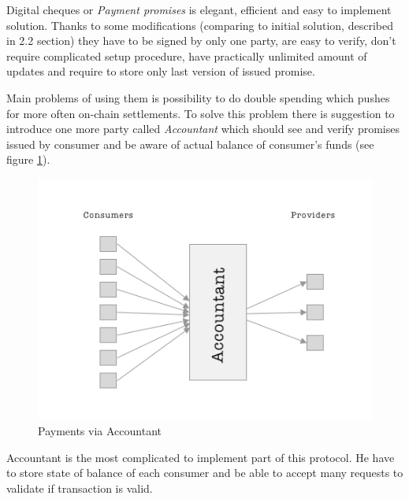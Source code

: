 \documentclass[a4paper,12pt]{article}
\begin{document}
Digital cheques or \textit{Payment promises} is elegant, efficient and easy to 
implement solution. Thanks to some modifications (comparing to initial solution,
described in 2.2 section) they have to be signed by only one party, are easy to 
verify, don't require complicated setup procedure, have practically unlimited 
amount of updates and require to store only last version of issued promise.

Main problems of using them is possibility to do double spending which pushes 
for more often on-chain settlements. To solve this problem there is suggestion 
to introduce one more party called \textit{Accountant} which should see and 
verify promises issued by consumer and be aware of actual balance of consumer's
funds (see figure \ref{img:unidirectional-payments}).

\begin{figure}[H]
    \centering
    \includegraphics[scale=0.5]{../img/unidirectional-payments}
    \caption{Payments via Accountant}
    \label{img:unidirectional-payments}
\end{figure}

Accountant is the most complicated to implement part of this protocol. He have 
to store state of balance of each consumer and be able to accept many requests 
to validate if transaction is valid.
\end{document}

